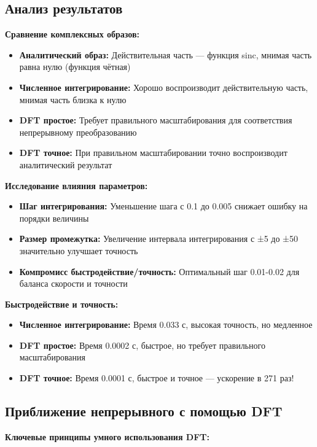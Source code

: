 \subsection*{Анализ результатов}

\textbf{Сравнение комплексных образов:}
\begin{itemize}
    \item \textbf{Аналитический образ:} Действительная часть — функция sinc, мнимая часть равна нулю (функция чётная)
    \item \textbf{Численное интегрирование:} Хорошо воспроизводит действительную часть, мнимая часть близка к нулю
    \item \textbf{DFT простое:} Требует правильного масштабирования для соответствия непрерывному преобразованию
    \item \textbf{DFT точное:} При правильном масштабировании точно воспроизводит аналитический результат
\end{itemize}

\textbf{Исследование влияния параметров:}
\begin{itemize}
    \item \textbf{Шаг интегрирования:} Уменьшение шага с 0.1 до 0.005 снижает ошибку на порядки величины
    \item \textbf{Размер промежутка:} Увеличение интервала интегрирования с ±5 до ±50 значительно улучшает точность
    \item \textbf{Компромисс быстродействие/точность:} Оптимальный шаг 0.01-0.02 для баланса скорости и точности
\end{itemize}

\textbf{Быстродействие и точность:}
\begin{itemize}
    \item \textbf{Численное интегрирование:} Время 0.033 с, высокая точность, но медленное
    \item \textbf{DFT простое:} Время 0.0002 с, быстрое, но требует правильного масштабирования
    \item \textbf{DFT точное:} Время 0.0001 с, быстрое и точное — ускорение в 271 раз!
\end{itemize}

\subsection*{Приближение непрерывного с помощью DFT}

\textbf{Ключевые принципы умного использования DFT:}

